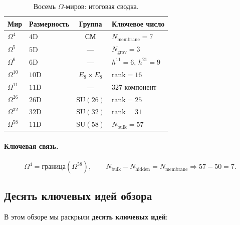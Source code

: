 \documentclass[11pt,a4paper]{article}
\newcommand{\SU}{\mathrm{SU}}
\newcommand{\Om}{\Omega^4}
\newcommand{\Omf}{\Omega^5}
\newcommand{\Oms}{\Omega^6}
\newcommand{\Omt}{\Omega^{10}}
\newcommand{\Ome}{\Omega^{11}}
\newcommand{\Omtw}{\Omega^{26}}
\newcommand{\Omth}{\Omega^{32}}
\newcommand{\Omfi}{\Omega^{58}}
\newcommand{\Nbulk}{N_{\text{bulk}}}
\newcommand{\Nhidden}{N_{\text{hidden}}}
\newcommand{\Nmembrane}{N_{\text{membrane}}}
\theoremstyle{definition}
\begin{document}
\begin{table}[htbp]
\centering
\caption{Восемь $\Omega$-миров: итоговая сводка.}
\label{tab:conclusions-eight-worlds}
\begin{tabular}{llcl}
\toprule
Мир & Размерность & Группа & Ключевое число \\
\midrule
$\Om$ & $4$D & СМ & $\Nmembrane = 7$ \\
$\Omf$ & $5$D & --- & $N_{\text{grav}} = 3$ \\
$\Oms$ & $6$D & --- & $h^{11} = 6$, $h^{21} = 9$ \\
$\Omt$ & $10$D & $E_8 \times E_8$ & $\mathrm{rank} = 16$ \\
$\Ome$ & $11$D & --- & $327$ компонент \\
$\Omtw$ & $26$D & $\SU(26)$ & $\mathrm{rank} = 25$ \\
$\Omth$ & $32$D & $\SU(32)$ & $\mathrm{rank} = 31$ \\
$\Omfi$ & $11$D & $\SU(58)$ & $\Nbulk = 57$ \\
\bottomrule
\end{tabular}
\end{table}

\paragraph{Ключевая связь.}
\begin{equation}
    \boxed{
    \Om = \text{граница}(\Omfi), \qquad
    \Nbulk - \Nhidden = \Nmembrane \Rightarrow 57 - 50 = 7.
    }
\end{equation}

\subsection{Десять ключевых идей обзора}
\label{subsec:conclusions-ten-ideas}

В этом обзоре мы раскрыли \textbf{десять ключевых идей}:
\end{document}

